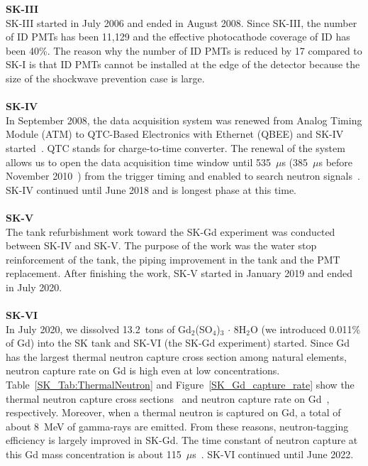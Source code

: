 \textbf{SK-III}\\
\hs
SK-III started in July 2006 and ended in August 2008.
Since SK-III, the number of ID PMTs has been 11,129 and the effective photocathode coverage of ID has been 40\%.
The reason why the number of ID PMTs is reduced by 17 compared to SK-I is that ID PMTs cannot be installed at the edge of the detector because the size of the shockwave prevention case is large.\\
\\
\textbf{SK-IV}\\
\hs
In September 2008, the data acquisition system was renewed from Analog Timing Module (ATM) to QTC-Based Electronics with Ethernet (QBEE) and SK-IV started~\cite{2009Nishino}.
QTC stands for charge-to-time converter.
The renewal of the system allows us to open the data acquisition time window until 535~$\mu$s (385~$\mu$s before November 2010~\cite{2021Abe}) from the trigger timing and enabled to search neutron signals~\cite{2009Watanabe}.
SK-IV continued until June 2018 and is longest phase at this time.\\
\\
\textbf{SK-V}\\
\hs
The tank refurbishment work toward the SK-Gd experiment was conducted between SK-IV and SK-V.
The purpose of the work was the water stop reinforcement of the tank, the piping improvement in the tank and the PMT replacement.
After finishing the work, SK-V started in January 2019 and ended in July 2020.\\
\\
\textbf{SK-VI}\\
\hs
In July 2020, we dissolved 13.2~tons of Gd$_{\text{2}}$(SO$_{\text{4}}$)$_{\text{3}}\,\cdot\,$8H$_{\text{2}}$O (we introduced 0.011\% of Gd) into the SK tank and SK-VI (the SK-Gd experiment) started.
Since Gd has the largest thermal neutron capture cross section among natural elements, neutron capture rate on Gd is high even at low concentrations.
Table~\ref{SK_Tab:ThermalNeutron} and Figure~\ref{SK_Gd_capture_rate} show the thermal neutron capture cross sections~\cite{2022MarkSlide} and neutron capture rate on Gd~\cite{2020Marti}, respectively.
Moreover, when a thermal neutron is captured on Gd, a total of about 8~MeV of gamma-rays are emitted.
From these reasons, neutron-tagging efficiency is largely improved in SK-Gd.
The time constant of neutron capture at this Gd mass concentration is about 115~$\mu$s~\cite{2022Abe}.
SK-VI continued until June 2022.\\

